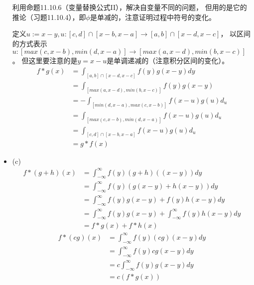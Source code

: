 \documentclass{article}
\begin{document}
\begin{itemize}
        利用命题11.10.6（变量替换公式II），解决自变量不同的问题，
        但用的是它的推论（习题11.10.4），即$\phi$是单减的，注意证明过程中符号的变化。

        定义$u := x - y, u : [c, d] \cap [x - b, x - a] \to [a, b] \cap [x - d, x - c]$，
        以区间的方式表示$u: [max(c, x - b), min(d, x - a)] \to [max(a, x - d), min(b, x - c)]$。
        但这里要注意的是$y = x - u$是单调递减的（注意积分区间的变化）。
        \begin{align*}
          f \ast g(x) & = \int_{[a, b] \cap [x - d, x - c]} f(y)g(x - y) dy       \\
                      & = \int_{[max(a, x - d), min(b, x - c)]} f(y)g(x - y)      \\
                      & = -\int_{[min(d, x - a), max(c, x - b)]} f(x - u)g(u) d_u \\
                      & = \int_{[max(c, x - b), min(d, x - a)]} f(x - u)g(u) d_u  \\
                      & = \int_{[c, d] \cap [x - b, x - a]} f(x - u)g(u) d_u      \\
                      & = g \ast f(x)
        \end{align*}
  \item (c)
        \begin{align*}
          f \ast (g + h)(x) & = \int_{-\infty}^{\infty} f(y)(g + h)((x - y)) dy                               \\
                            & = \int_{-\infty}^{\infty} f(y)(g(x - y) + h(x - y)) dy                          \\
                            & = \int_{-\infty}^{\infty} f(y)g(x - y) + f(y)h(x - y) dy                        \\
                            & = \int_{-\infty}^{\infty} f(y)g(x - y) + \int_{-\infty}^{\infty}f(y)h(x - y) dy \\
                            & = f \ast g(x) + f \ast h(x)
        \end{align*}
        \begin{align*}
          f * (cg)(x) & = \int_{-\infty}^{\infty} f(y)(cg)(x - y)  dy \\
                      & = \int_{-\infty}^{\infty} f(y)cg(x - y)  dy   \\
                      & = c\int_{-\infty}^{\infty} f(y)g(x - y)  dy   \\
                      & = c(f \ast g(x))
        \end{align*}
\end{itemize}
\end{document}
